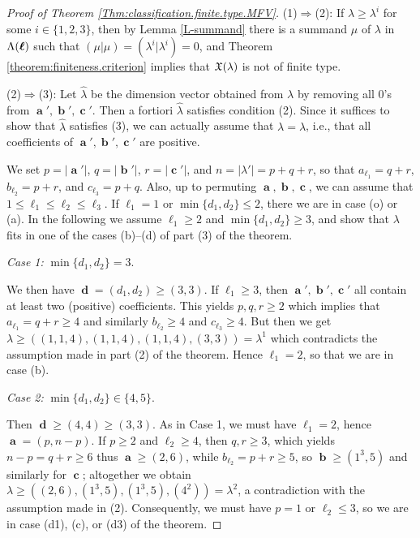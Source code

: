 \documentclass[12pt,reqno]{amsart}
\begin{document}
\begin{proof}[Proof  of Theorem \ref{Thm:classification.finite.type.MFV}]
(1)$\Rightarrow$(2): If $\lambda\geq\lambda^i$ for some $i\in\{1,2,3\}$, then by Lemma \ref{L-summand}
there is a summand $\mu$ of $\lambda$ in $\Lambda(\boldsymbol{\ell})$ such that $(\mu|\mu)=(\lambda^i|\lambda^i)=0$,
and Theorem \ref{theorem:finiteness.criterion} implies that $\mathfrak{X}(\lambda)$ is not of finite type.

\bigskip

(2)$\Rightarrow$(3):
Let $\hat\lambda$ be the dimension vector obtained from $\lambda$
by removing all $0$'s from $\mbfa',\mbfb',\mbfc'$. Then a fortiori $\hat\lambda$ satisfies condition (2). Since it suffices to show that $\hat\lambda$ satisfies (3), we can actually assume that $\lambda=\hat\lambda$, i.e., that all coefficients of $\mbfa',\mbfb',\mbfc'$ are positive.

We set $p=|\mbfa'|$, $q=|\mbfb'|$, $r=|\mbfc'|$, and $n=|\lambda'|=p+q+r$, so that $a_{\ell_1}=q+r$,
$b_{\ell_2}=p+r$, and $c_{\ell_3}=p+q$.
Also, up to permuting $\mbfa,\mbfb,\mbfc$, we can assume that
$1\leq \ell_1\leq \ell_2\leq \ell_3$.
If $\ell_1=1$ or $\min\{d_1,d_2\}\leq 2$, there we are in case (o) or (a). In the following we assume $\ell_1\geq 2$ and $\min\{d_1,d_2\}\geq 3$,
and show that $\lambda$ fits in one of the cases (b)--(d) of part (3) of the theorem.

\medskip\noindent
{\it Case 1:} $\min\{d_1,d_2\}=3$.

We then have $\mbfd=(d_1,d_2)\geq(3,3)$.
If $\ell_1\geq 3$, then $\mbfa',\mbfb',\mbfc'$ all contain at least two (positive) coefficients. This yields $p,q,r\geq 2$ which implies that $a_{\ell_1}=q+r\geq 4$ and similarly $b_{\ell_2}\geq 4$ and $c_{\ell_3}\geq 4$. But then we get $\lambda\geq((1,1,4),(1,1,4),(1,1,4),(3,3))=\lambda^1$ which contradicts the assumption made in part (2) of the theorem. Hence $\ell_1=2$, so that we are in case (b).

\medskip\noindent
{\it Case 2:} $\min\{d_1,d_2\}\in\{4,5\}$.

Then $\mbfd\geq (4,4)\geq (3,3)$. As in Case 1, we must have $\ell_1=2$, hence $\mbfa=(p,n-p)$.
If $p\geq 2$ and $\ell_2\geq 4$, then $q,r\geq 3$, which
yields $n-p=q+r\geq 6$ thus $\mbfa\geq (2,6)$, while $b_{\ell_2}=p+r\geq 5$, so $\mbfb\geq (1^3,5)$
and similarly for $\mbfc$; altogether we obtain $\lambda\geq ((2,6),(1^3,5),(1^3,5),(4^2))=\lambda^2$, a contradiction with the assumption made in (2).
Consequently, we must have $p=1$ or $\ell_2\leq 3$, so we are in case (d1), (c), or (d3) of the theorem.


\end{proof}
\end{document}
